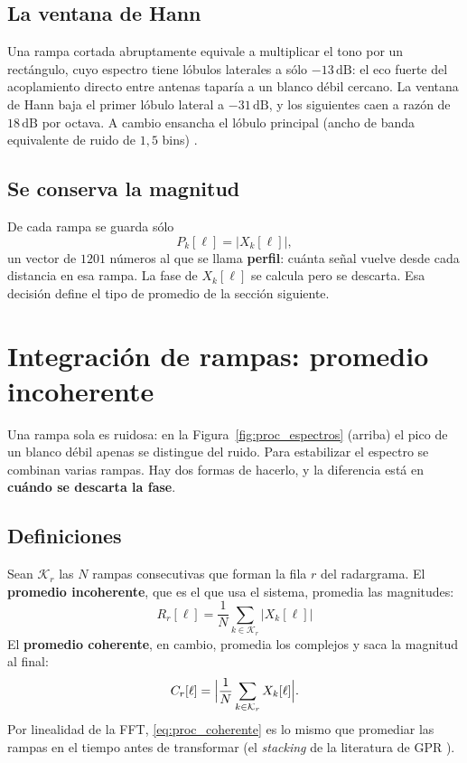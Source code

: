 \subsection{La ventana de Hann}

Una rampa cortada abruptamente equivale a multiplicar el tono por un
rectángulo, cuyo espectro tiene lóbulos laterales a sólo $-13\,\text{dB}$:
el eco fuerte del acoplamiento directo entre antenas taparía a un blanco
débil cercano. La ventana de Hann baja el primer lóbulo lateral a
$-31\,\text{dB}$, y los siguientes caen a razón de $18\,\text{dB}$ por
octava. A cambio ensancha el lóbulo principal (ancho de banda equivalente de
ruido de $1{,}5$ bins) \cite{Harris1978}.

\subsection{Se conserva la magnitud}

De cada rampa se guarda sólo
\begin{equation}
  P_k[\ell] = \bigl\lvert X_k[\ell] \bigr\rvert,
  \label{eq:proc_perfil}
\end{equation}
un vector de $1201$ números al que se llama \textbf{perfil}: cuánta señal
vuelve desde cada distancia en esa rampa. La fase de $X_k[\ell]$ se calcula
pero se descarta. Esa decisión define el tipo de promedio de la sección
siguiente.

\section{Integración de rampas: promedio incoherente}
\label{sec:proc_promedio}

Una rampa sola es ruidosa: en la Figura~\ref{fig:proc_espectros} (arriba) el
pico de un blanco débil apenas se distingue del ruido. Para estabilizar el
espectro se combinan varias rampas. Hay dos formas de hacerlo, y la
diferencia está en \textbf{cuándo se descarta la fase}.

\subsection{Definiciones}

Sean $\mathcal{K}_r$ las $N$ rampas consecutivas que forman la fila $r$ del
radargrama. El \textbf{promedio incoherente}, que es el que usa el sistema,
promedia las magnitudes:
\begin{equation}
  \boxed{\;
    R_r[\ell] = \frac{1}{N}\sum_{k\in\mathcal{K}_r}
    \bigl\lvert X_k[\ell]\bigr\rvert
  \;}
  \label{eq:proc_incoherente}
\end{equation}
El \textbf{promedio coherente}, en cambio, promedia los complejos y saca la
magnitud al final:
\begin{equation}
  C_r[\ell] = \Bigl\lvert \frac{1}{N}\sum_{k\in\mathcal{K}_r}
    X_k[\ell] \Bigr\rvert .
  \label{eq:proc_coherente}
\end{equation}
Por linealidad de la FFT, \eqref{eq:proc_coherente} es lo mismo que promediar
las rampas en el tiempo antes de transformar (el \emph{stacking} de la
literatura de GPR \cite{Daniels2004}).

